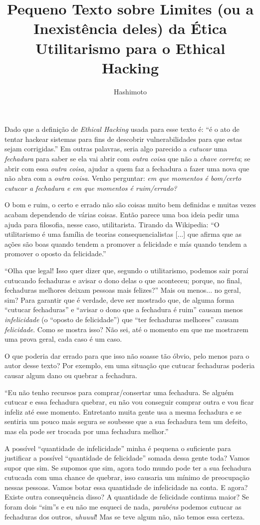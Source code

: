 \documentclass{article}
\begin{document}
\title{Pequeno Texto sobre Limites (ou a Inexistência deles) da Ética Utilitarismo para o Ethical Hacking}
\author{Hashimoto}
\date{}
\maketitle

Dado que a definição de \emph{Ethical Hacking} usada para esse texto é:
``é o ato de tentar hackear sistemas para fins de descobrir
vulnerabilidades para que estas sejam corrigidas.''
Em outras palavras,
seria algo parecido a \emph{cutucar} uma \emph{fechadura}
para saber se ela vai abrir com \emph{outra coisa}
que não a \emph{chave correta};
se abrir com essa \emph{outra coisa},
ajudar a quem faz a fechadura
a fazer uma nova que não abra com a \emph{outra coisa}.
Venho perguntar:
\emph{em que momentos é bom/certo cutucar a fechadura e
em que momentos é ruim/errado?}

O bom e ruim, o certo e errado
não são coisas muito bem definidas e
muitas vezes acabam dependendo de várias coisas.
Então parece uma boa ideia pedir uma ajuda para filosofia,
nesse caso, utilitarista.
Tirando da Wikipedia:
``O utilitarismo é uma família de teorias consequencialistas [...]
que afirma que as ações são boas quando
tendem a promover a felicidade
e más quando tendem a promover o oposto da felicidade.''

``Olha que legal! Isso quer dizer que,
segundo o utilitarismo,
podemos sair poraí cutucando fechaduras
e avisar o dono delas o que aconteceu;
porque, no final,
fechaduras melhores deixam pessoas mais felizes?''
Mais ou menos... no geral, sim?
Para garantir que é verdade,
deve ser mostrado que, de alguma forma
``cutucar fechaduras'' e ``avisar o dono que a fechadura é ruim''
causam menos \emph{infelicidade} (o ``oposto de felicidade'')
que ``ter fechaduras melhores'' causam \emph{felicidade}.
Como se mostra isso?
Não sei, até o momento em que me mostrarem uma prova geral,
cada caso é um caso.

O que poderia dar errado para que isso não soasse tão óbvio,
pelo menos para o autor desse texto?
Por exemplo, em uma situação que
cutucar fechaduras poderia causar algum dano ou quebrar a fechadura.

``Eu não tenho recursos para comprar/consertar uma fechadura.
Se alguém cutucar e essa fechadura quebrar,
eu não vou conseguir comprar outra e vou ficar infeliz até esse momento.
Entretanto muita gente usa a mesma fechadura e
se sentiria um pouco mais segura
se soubesse que a sua fechadura tem um defeito,
mas ela pode ser trocada por uma fechadura melhor.''

A possível ``quantidade de infelicidade'' minha
é pequena o suficiente para justificar a possível
``quantidade de felicidade'' somada dessa gente toda?
Vamos supor que sim.
Se supomos que sim,
agora todo mundo pode ter a sua fechadura cutucada
com uma chance de quebrar,
isso causaria um mínimo de preocupação nessas pessoas.
Vamos botar essa quantidade de infelicidade na conta.
E agora? Existe outra consequência disso?
A quantidade de felicidade continua maior?
Se foram dois ``sim''s e eu não me esqueci de nada,
\emph{parabéns} podemos cutucar as fechaduras dos outros, \emph{uhuuul}!
Mas se teve algum não, não temos essa certeza.
\end{document}
